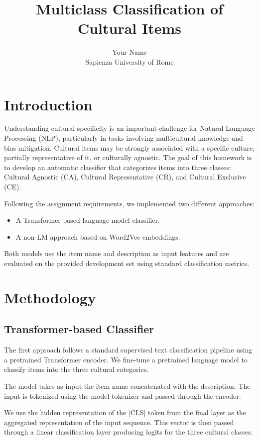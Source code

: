 \documentclass[11pt]{article}
\title{Multiclass Classification of Cultural Items}
\author{Your Name \\ Sapienza University of Rome}
\date{}
\begin{document}
\maketitle

\section{Introduction}

Understanding cultural specificity is an important challenge for Natural Language Processing (NLP), particularly in tasks involving multicultural knowledge and bias mitigation. Cultural items may be strongly associated with a specific culture, partially representative of it, or culturally agnostic. The goal of this homework is to develop an automatic classifier that categorizes items into three classes: Cultural Agnostic (CA), Cultural Representative (CR), and Cultural Exclusive (CE).

Following the assignment requirements, we implemented two different approaches:
\begin{itemize}
\item A Transformer-based language model classifier.
\item A non-LM approach based on Word2Vec embeddings.
\end{itemize}

Both models use the item name and description as input features and are evaluated on the provided development set using standard classification metrics.

\section{Methodology}

\subsection{Transformer-based Classifier}

The first approach follows a standard supervised text classification pipeline using a pretrained Transformer encoder. We fine-tune a pretrained language model to classify items into the three cultural categories.

The model takes as input the item name concatenated with the description. The input is tokenized using the model tokenizer and passed through the encoder.

We use the hidden representation of the [CLS] token from the final layer as the aggregated representation of the input sequence. This vector is then passed through a linear classification layer producing logits for the three cultural classes.
\end{document}
